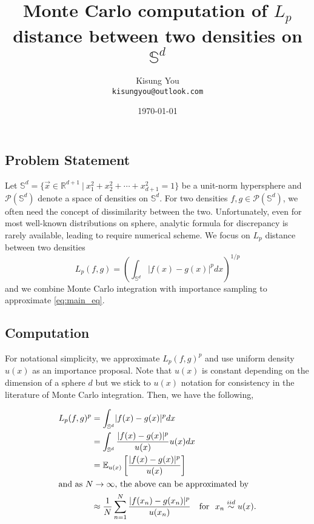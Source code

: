 \documentclass[fontsize=12pt]{article}
\title{Monte Carlo computation of $L_p$ distance between two densities on $\mathbb{S}^d$}
\author{
	Kisung You\\
	\texttt{kisungyou@outlook.com}
}
\date{\today}
\begin{document}
\maketitle

\subsection*{Problem Statement}

Let $\mathbb{S}^d = \lbrace \vec{x} \in \mathbb{R}^{d+1} ~\vert~  x_1^2 + x_2^2 + \cdots + x_{d+1}^2 = 1 \rbrace$ be a unit-norm hypersphere and $\mathcal{P}(\mathbb{S}^d)$ denote a space of densities on $\mathbb{S}^d$. For two densities $f,g \in \mathcal{P}(\mathbb{S}^d)$, we often need the concept of dissimilarity between the two. Unfortunately, even for most well-known distributions on sphere, analytic formula for discrepancy is rarely available, leading to require numerical scheme. We focus on $L_p$ distance between two densities
\begin{equation}
L_p (f,g) = \left( \int_{\mathbb{S}^d} \lvert f(x) - g(x) \rvert^p dx \right)^{1/p} \label{eq:main_eq}
\end{equation}
and we combine Monte Carlo integration with importance sampling to approximate \eqref{eq:main_eq}.


\vspace{1cm}
\subsection*{Computation}
For notational simplicity, we approximate $L_p (f,g)^p$ and use uniform density $u(x)$ as an importance proposal. Note that $u(x)$ is constant depending on the dimension of a sphere $d$ but we stick to $u(x)$ notation for consistency in the literature of Monte Carlo integration. Then, we have the following,

\begin{align*}
L_p (f,g)^p &= \int_{\mathbb{S}^d} \lvert f(x) - g(x) \rvert^p dx \\
&= \int_{\mathbb{S}^d} \frac{\lvert f(x) - g(x) \rvert^p}{u(x)} u(x)  dx \\
&= \mathbb{E}_{u(x)} \left[ \frac{\lvert f(x) - g(x) \rvert^p}{u(x)} \right] \\
\intertext{and as $N\rightarrow \infty$, the above can be approximated by}
&\approx  \frac{1}{N} \sum_{n=1}^N  \frac{\lvert f(x_n) - g(x_n) \rvert^p}{u(x_n)} \quad \textrm{for }~   x_n \stackrel{iid}{\sim}  u(x).
\end{align*}

%
%
\end{document}
